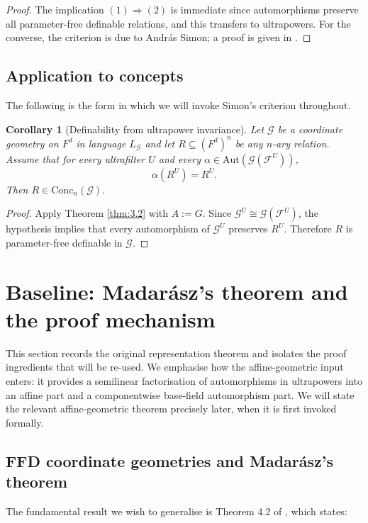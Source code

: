 \documentclass[11pt,a4paper]{article}
\newcommand{\G}{\mathcal{G}}
\newcommand{\F}{\mathcal{F}}
\newtheorem{corollary}[theorem]{Corollary}
\theoremstyle{definition}
\begin{document}
\begin{proof}
	The implication $(1)\Rightarrow (2)$ is immediate since
automorphisms preserve all parameter-free definable relations, and this
transfers to ultrapowers. For the converse, the criterion is due to
András Simon; a proof is given in \cite[Theorem~6.12]{MSS26}.
\end{proof}


\subsection{Application to concepts}

The following is the form in which we will invoke Simon's criterion
throughout.

\begin{corollary}[Definability from ultrapower invariance]
\label{cor:3.4}
Let
$\G$ be a coordinate geometry on $F^d$ in language $L_{\G}$ and let
$R\subseteq (F^d)^n$ be any $n$-ary relation. Assume that for every
ultrafilter $U$ and every $\alpha\in \mathrm{Aut}(\G(\F^U))$,
\[
\alpha(R^U)=R^U.
\] Then $R\in \mathrm{Conc}_n(\G)$.
\end{corollary}

\begin{proof}
	Apply Theorem \ref{thm:3.2} with $A:=G$. Since
$\G^U\cong \G(\F^U)$, the hypothesis implies that every
automorphism of $\G^U$ preserves $R^U$. Therefore $R$ is
parameter-free definable in $\G$.
\end{proof}


\section{Baseline: Madarász's theorem and the proof mechanism}
\label{sec:4}

This section records the original representation theorem and isolates
the proof ingredients that will be re-used. We emphasise how the
affine-geometric input enters: it provides a semilinear factorisation of
automorphisms in ultrapowers into an affine part and a componentwise
base-field automorphism part. We will state the relevant
affine-geometric theorem precisely later, when it is first invoked
formally.

\subsection{FFD coordinate geometries and Madar\'asz's theorem}
\label{sec:4.1}

The fundamental result we wish to generalise is Theorem 4.2 of \cite{MSS26}, which states:
\end{document}
